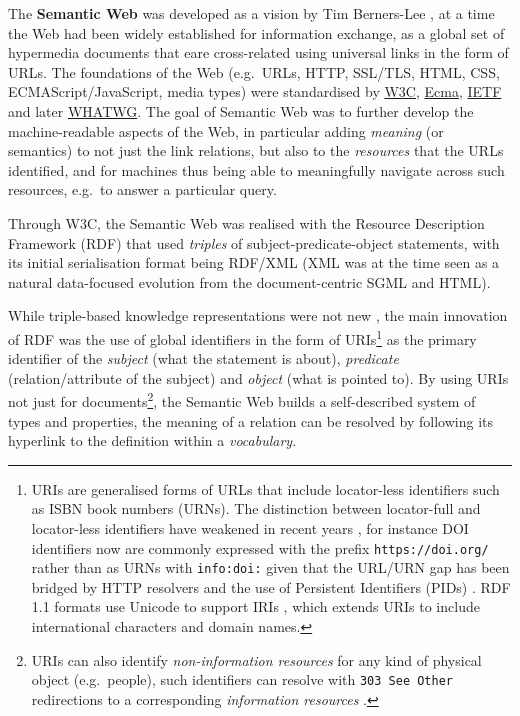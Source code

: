 \documentclass[fleqn,10pt,lineno]{wlpeerj}
\begin{document}
The \textbf{Semantic Web} was developed as a vision by Tim Berners-Lee \cite{Guy7cjVY}, at a time the Web had been widely established for information exchange, as a global set of hypermedia documents that eare cross-related using universal links in the form of URLs. The foundations of the Web (e.g.~URLs, HTTP, SSL/TLS, HTML, CSS, ECMAScript/JavaScript, media types) were standardised by \href{https://www.w3.org/standards/}{W3C}, \href{https://www.ecma-international.org/}{Ecma}, \href{https://www.ietf.org/standards/}{IETF} and later \href{https://whatwg.org/}{WHATWG}. The goal of Semantic Web was to further develop the machine-readable aspects of the Web, in particular adding \emph{meaning} (or semantics) to not just the link relations, but also to the \emph{resources} that the URLs identified, and for machines thus being able to meaningfully navigate across such resources, e.g.~to answer a particular query.

Through W3C, the Semantic Web was realised with the Resource Description Framework (RDF) \cite{16WGmCih8} that used \emph{triples} of subject-predicate-object statements, with its initial serialisation format \cite{16wvFH4nh} being RDF/XML (XML was at the time seen as a natural data-focused evolution from the document-centric SGML and HTML).

While triple-based knowledge representations were not new \cite{NxvhwSmG}, the main innovation of RDF was the use of global identifiers in the form of URIs\footnote{URIs \cite{RRtwPF7Y} are generalised forms of URLs that include locator-less identifiers
  such as ISBN book numbers (URNs). The distinction between locator-full and locator-less identifiers have weakened in recent years \cite{nW4HY8Nq}, for instance DOI identifiers now are commonly expressed with the prefix \texttt{https://doi.org/} rather than as URNs with \texttt{info:doi:} given that the URL/URN gap has been bridged by HTTP resolvers and the use of Persistent Identifiers (PIDs) \cite{HqZ3r6J3}. RDF 1.1 formats use Unicode to support IRIs \cite{rqjuXkEf}, which extends URIs to include international characters and domain names.} as the primary identifier of the \emph{subject} (what the statement is about), \emph{predicate} (relation/attribute of the subject) and \emph{object} (what is pointed to). By using URIs not just for documents\footnote{URIs can also identify \emph{non-information resources} for any kind of physical object (e.g.~people), such identifiers can resolve with \texttt{303\ See\ Other} redirections to a corresponding \emph{information resources} \cite{rnzJ4khD}.}, the Semantic Web builds a self-described system of types and properties, the meaning of a relation can be resolved by following its hyperlink to the definition within a \emph{vocabulary}.
\end{document}

